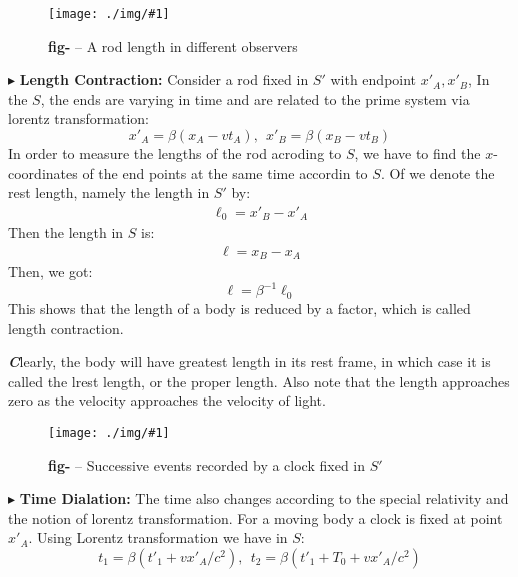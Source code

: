 \documentclass[10pt,a4paper,twocolumn]{article}
\newcounter{figurecounter}
\newcommand{\img}[3]{
    \begin{figure}[h!]
        \centering
        \captionsetup{justification=centering,margin=0cm,labelformat=empty}
        \texttt{[image: ./img/\#1]}
        \label{figure}
        \caption{\small\textbf{fig-\thefigurecounter} -- \textcolor{darkliver}{#3}}
    \end{figure}
    \addtocounter{figurecounter}{1}}
\newenvironment{callout}
	{\begin{calloutbox}\color{charcoal}\textbf\textit}
	{\end{calloutbox}}
\newcommand{\newpoint}[1]{\indent$\blacktriangleright$ \textbf{#1}}
\begin{document}
                \img{lengthcontraction}{0.9}{A rod length in different observers}
                \newpoint{Length Contraction:}
                Consider a rod fixed in $S'$ with endpoint $x'_A , x'_B$, In the $S$, the ends are varying in time and are related to the prime system via lorentz transformation:
                \begin{equation}
                    x'_A = \beta(x_A - vt_A), \ \ x'_B = \beta(x_B-vt_B)
                \end{equation}
                In order to measure the lengths of the rod acroding to $S$, we have to find the $x$-coordinates of the end points at the same time accordin to $S$. Of we denote the rest length, namely the length in $S'$ by:
                \begin{align*}
                    \ell_0 = x'_B - x'_A
                \end{align*}
                Then the length in $S$ is:
                \begin{align*}
                    \ell = x_B-x_A
                \end{align*}
                Then, we got:
                \begin{equation}
                    \boxed{
                        \ell = \beta^{-1}\ell_0
                    }
                \end{equation}
                This shows that the length of a body is reduced by a factor, which is called length contraction.
                \begin{callout}
                    Clearly, the body will have greatest length in its rest frame, in which case it is called the lrest length, or the proper length. Also note that the length approaches zero as the velocity approaches the velocity of light.
                \end{callout}
                \img{timedialationone}{0.8}{Successive events recorded by a clock fixed in $S'$}
                \newpoint{Time Dialation:} The time also changes according to the special relativity and the notion of lorentz transformation. For a moving body a clock is fixed at point $x'_A$. Using Lorentz transformation we have in $S$:
                \begin{equation}
                    t_1 = \beta(t'_1 + vx'_A/c^2), \ \ t_2 = \beta(t'_1 +T_0 + vx'_A/c^2)
                \end{equation}
                
\end{document}
